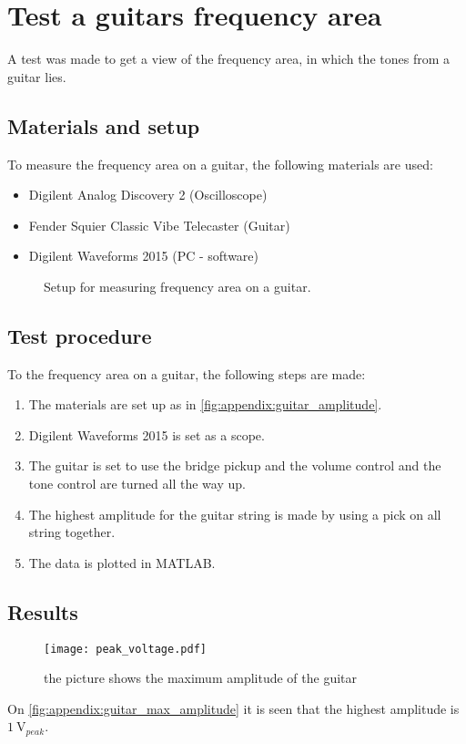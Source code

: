 \chapter{Test a guitars frequency area}\label{app:frequency_area}
A test was made to get a view of the frequency area, in which the tones from a guitar lies.

\section*{Materials and setup}
To measure the frequency area on a guitar, the following materials are used:
\begin{itemize}
\item Digilent Analog Discovery 2 (Oscilloscope)
\item Fender Squier Classic Vibe Telecaster (Guitar)
\item Digilent Waveforms 2015 (PC - software)
\end{itemize}

\begin{figure}[htbp!]
\centering
\def\svgwidth{\columnwidth}

\caption{Setup for measuring frequency area on a guitar.}
		\label{fig:appendix:guitar_amplitude}
\end{figure}

\section*{Test procedure}
To the frequency area on a guitar, the following steps are made:
\begin{enumerate}
\item The materials are set up as in \autoref{fig:appendix:guitar_amplitude}.
\item Digilent Waveforms 2015 is set as a scope. 
\item The guitar is set to use the bridge pickup and the volume control and the tone control are turned all the way up.
\item The highest amplitude for the guitar string is made by using a pick on all string together.
\item The data is plotted in MATLAB.
\end{enumerate}

\section*{Results}

\begin{figure}[htbp!]
	\centering
		\texttt{[image: peak\_voltage.pdf]}
		\caption{the picture shows the maximum amplitude of the guitar}
		\label{fig:appendix:guitar_max_amplitude}
\end{figure}

On  \autoref{fig:appendix:guitar_max_amplitude} it is seen that the highest amplitude is $\SI{1}{\volt}_{peak}$.
